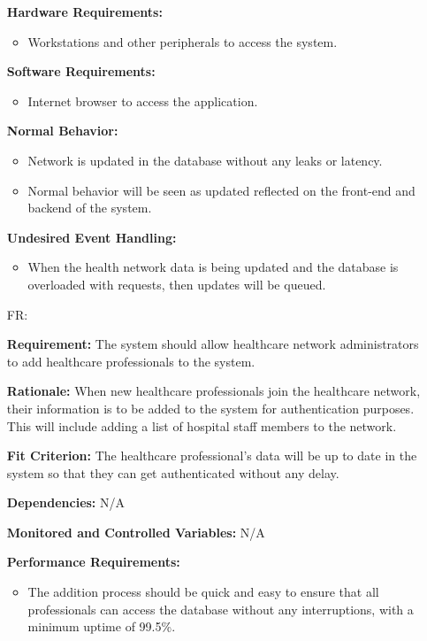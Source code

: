 \documentclass[12pt]{article}
\newcounter{reqnum} %
\begin{document}
\begin{itemize}
  \textbf{Hardware Requirements:} 
  \begin{itemize}
    \item Workstations and other peripherals to access the system.
  \end{itemize}
  
  \textbf{Software Requirements:} 
  \begin{itemize}
    \item Internet browser to access the application.
  \end{itemize}
  
  \textbf{Normal Behavior:}
  \begin{itemize}
    \item Network is updated in the database without any leaks or latency.
    \item Normal behavior will be seen as updated reflected on the front-end and backend of the system.
  \end{itemize} 
  
  \textbf{Undesired Event Handling:} 
  \begin{itemize}
    \item When the health network data is being updated and the database is overloaded with requests, then updates will be queued.
  \end{itemize}
  
  \item[FR\refstepcounter{reqnum}\thereqnum \label{FR_AddHealthProfessional}:]
  
  \textbf{Requirement:} The system should allow healthcare network administrators to add healthcare professionals to the system.
  
  \textbf{Rationale:} When new healthcare professionals join the healthcare network, their information is to be added to the system for authentication purposes. This will include adding a list of hospital staff members to the network.
  
  \textbf{Fit Criterion:} The healthcare professional's data will be up to date in the system so that they can get authenticated without any delay. 
  
  \textbf{Dependencies:} N/A 
  
  \textbf{Monitored and Controlled Variables:} N/A
  
  \textbf{Performance Requirements:} 
  \begin{itemize}
    \item The addition process should be quick and easy to ensure that all professionals can access the database without any interruptions, with a minimum uptime of 99.5\%.
  \end{itemize}
  

\end{itemize}
\end{document}
